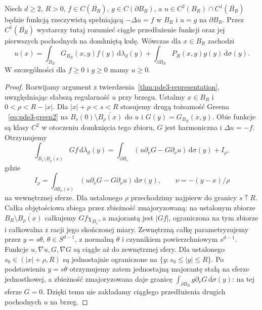 \begin{twierdzenie}
\label{thm:pde14-green-repr}
Niech $d\ge2$, $R>0$, $f\in C(\overline{B_R})$,
$g\in C(\partial B_R)$, a
$u\in C^2(B_R)\cap C^1(\overline{B_R})$ będzie funkcją
rzeczywistą spełniającą $-\Delta u=f$ w $B_R$
i $u=g$ na $\partial B_R$. Przez $C^1(\overline{B_R})$
wystarczy tutaj rozumieć ciągłe przedłużenie funkcji
oraz jej pierwszych pochodnych na domkniętą kulę.
Wówczas dla $x\in B_R$ zachodzi
\begin{equation}\label{eq:pde14-green-repr}
 u(x)=\int_{B_R}G_{B_R}(x,y)f(y)\,\mathrm d\lambda_d(y)
 +\int_{\partial B_R}P_R(x,y)g(y)\,\mathrm d\sigma(y).
\end{equation}
W szczególności dla $f\ge0$ i $g\ge0$ mamy $u\ge0$.
\end{twierdzenie}
\begin{proof}
Rozwijamy argument z twierdzenia~\ref{thm:pde3-representation},
uwzględniając słabszą regularność $u$ przy brzegu.
Ustalmy $x\in B_R$ i $0<\rho<R-|x|$. Dla
$|x|+\rho<s<R$ stosujemy drugą tożsamość Greena
~\eqref{eq:pde3-green2} na $B_s(0)\setminus
\overline{B_\rho(x)}$ do $u$ i $G(y)=G_{B_R}(x,y)$.
Obie funkcje są klasy $C^2$ w otoczeniu domknięcia
tego zbioru, $G$ jest harmoniczna i $\Delta u=-f$.
Otrzymujemy
\[
 \int_{B_s\setminus\overline{B_\rho(x)}}Gf\,
 \mathrm d\lambda_d(y)
 =\int_{\partial B_s}(u\partial_\nu G-G\partial_\nu u)
 \,\mathrm d\sigma(y)+I_\rho,
\]
gdzie
\[
 I_\rho=\int_{\partial B_\rho(x)}
 (u\partial_\nu G-G\partial_\nu u)\,\mathrm d\sigma(y),
 \qquad \nu=-(y-x)/\rho
\]
na wewnętrznej sferze. Dla ustalonego $\rho$ przechodzimy
najpierw do granicy $s\uparrow R$. Całka objętościowa
zbiega przez zbieżność zmajoryzowaną: na ustalonym
zbiorze $B_R\setminus\overline{B_\rho(x)}$ całkujemy
$Gf\chi_{B_s}$, a majorantą jest $|Gf|$, ograniczona
na tym zbiorze i całkowalna z racji jego skończonej miary. Zewnętrzną całkę
parametryzujemy przez $y=s\theta$, $\theta\in S^{d-1}$,
z normalną $\theta$ i czynnikiem powierzchniowym
$s^{d-1}$. Funkcje $u,\nabla u,G,\nabla G$ są ciągłe
aż do zewnętrznej sfery. Dla ustalonego
$s_0\in(|x|+\rho,R)$ są jednostajnie ograniczone na
$\{y:s_0\le|y|\le R\}$. Po podstawieniu $y=s\theta$
otrzymujemy zatem jednostajną majorantę stałą na
sferze jednostkowej, a zbieżność zmajoryzowana daje granicę
$\int_{\partial B_R}g\partial_\nu G\,\mathrm d\sigma(y)$:
na tej sferze $G=0$. Dzięki temu nie zakładamy
ciągłego przedłużenia drugich pochodnych $u$ na brzeg.


\end{proof}
